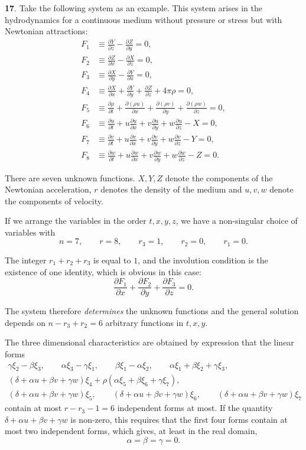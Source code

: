 \documentclass[leqno,11pt]{article}
\newcommand{\pd}{\partial}
\theoremstyle{shape1}
\theoremstyle{shape0}
\theoremstyle{shape2}
\theoremstyle{definition}
\begin{document}
\textbf{17}. Take the following system as an example. This system arises in the hydrodynamics for a continuous medium without pressure or stress but with Newtonian attractions:
\begin{align*}
  F_{1}&\equiv\frac{\pd Y}{\pd z}-\frac{\pd Z}{\pd y}=0,\\
  F_{2}&\equiv\frac{\pd Z}{\pd x}-\frac{\pd X}{\pd z}=0,\\
  F_{3}&\equiv\frac{\pd X}{\pd y}-\frac{\pd Y}{\pd x}=0,\\
  F_{4}&\equiv\frac{\pd X}{\pd x}+\frac{\pd Y}{\pd y}+\frac{\pd Z}{\pd z}+4\pi\rho=0,\\
  F_{5}&\equiv\frac{\pd \rho}{\pd t}+\frac{\pd (\rho u)}{\pd x}+\frac{\pd (\rho v)}{\pd y}+\frac{\pd (\rho w)}{\pd z}=0,\\
  F_{6}&\equiv\frac{\pd u}{\pd t}+u\frac{\pd u}{\pd x}+v\frac{\pd u}{\pd y}+w\frac{\pd u}{\pd z}-X=0,\\
  F_{7}&\equiv\frac{\pd v}{\pd t}+u\frac{\pd v}{\pd x}+v\frac{\pd v}{\pd y}+w\frac{\pd v}{\pd z}-Y=0,\\
  F_{8}&\equiv\frac{\pd w}{\pd t}+u\frac{\pd w}{\pd x}+v\frac{\pd w}{\pd y}+w\frac{\pd w}{\pd z}-Z=0.
\end{align*}

There are seven unknown functions. $X,Y,Z$ denote the components of the Newtonian acceleration, $r$ denotes the density of the medium and $u,v,w$ denote the components of velocity.

If we arrange the variables in the order $t,x,y,z$, we have a non-singular choice of variables with
\[
n=7,\qquad r=8,\qquad r_{3}=1,\qquad r_{2}=0,\qquad r_{1}=0.
\]

The integer $r_{1}+r_{2}+r_{3}$ is equal to $1$, and the involution condition is the existence of one identity, which is obvious in this case:
\[
\frac{\pd F_{1}}{\pd x}+\frac{\pd F_{2}}{\pd y}+\frac{\pd F_{3}}{\pd z}=0.
\]

The system therefore \emph{determines} the unknown functions and the general solution depends on $n-r_{3}+r_{2}=6$ arbitrary functions in $t,x,y$.

The three dimensional characteristics are obtained by expression that the linear forms
\begin{gather*}
  \gamma\xi_{2}-\beta\xi_{3},\qquad \alpha\xi_{3}-\gamma\xi_{1},\qquad\beta\xi_{1}-\alpha\xi_{2},\qquad\alpha\xi_{1}+\beta\xi_{2}+\gamma\xi_{3},\\
  (\delta+\alpha u+\beta v+\gamma w)\xi_{4}+\rho(\alpha\xi_{5}+\beta\xi_{6}+\gamma\xi_{7}),\\
  (\delta+\alpha u+\beta v+\gamma w)\xi_{5},\qquad(\delta+\alpha u+\beta v+\gamma w)\xi_{6},\qquad (\delta+\alpha u+\beta v+\gamma w)\xi_{7}
\end{gather*}
contain at most $r-r_{3}-1=6$ independent forms at most. If the quantity $\delta+\alpha u+\beta v+\gamma w$ is non-zero, this requires that the first four forms contain at most two independent forms, which gives, at least in the real domain,
\[
\alpha=\beta=\gamma=0.
\]
\end{document}
